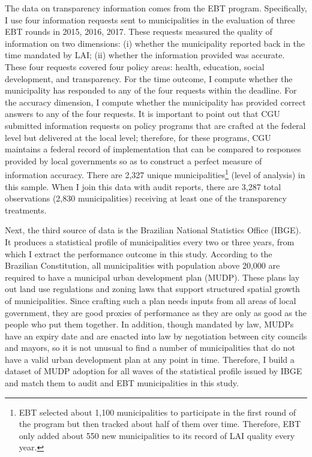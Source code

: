 \documentclass[11pt]{article}
\begin{document}
The data on transparency information comes from the EBT program. Specifically, I use four information requests sent to municipalities in the evaluation of three EBT rounds in 2015, 2016, 2017. These requests measured the quality of information on two dimensions: (i) whether the municipality reported back in the time mandated by LAI; (ii) whether the information provided was accurate. These four requests covered four policy areas: health, education, social development, and transparency. For the time outcome, I compute whether the municipality has responded to any of the four requests within the deadline. For the accuracy dimension, I compute whether the municipality has provided correct answers to any of the four requests. It is important to point out that CGU submitted information requests on policy programs that are crafted at the federal level but delivered at the local level; therefore, for these programs, CGU maintains a federal record of implementation that can be compared to responses provided by local governments so as to construct a perfect measure of information accuracy. There are 2,327 unique municipalities\footnote{EBT selected about 1,100 municipalities to participate in the first round of the program but then tracked about half of them over time. Therefore, EBT only added about 550 new municipalities to its record of LAI quality every year.} (level of analysis) in this sample. When I join this data with audit reports, there are 3,287 total observations (2,830 municipalities) receiving at least one of the transparency treatments.

Next, the third source of data is the Brazilian National Statistics Office (IBGE). It produces a statistical profile of municipalities every two or three years, from which I extract the performance outcome in this study. According to the Brazilian Constitution, all municipalities with population above 20,000 are required to have a municipal urban development plan (MUDP). These plans lay out land use regulations and zoning laws that support structured spatial growth of municipalities. Since crafting such a plan needs inputs from all areas of local government, they are good proxies of performance as they are only as good as the people who put them together. In addition, though mandated by law, MUDPs have an expiry date and are enacted into law by negotiation between city councils and mayors, so it is not unusual to find a number of municipalities that do not have a valid urban development plan at any point in time. Therefore, I build a dataset of MUDP adoption for all waves of the statistical profile issued by IBGE and match them to audit and EBT municipalities in this study.
\end{document}
